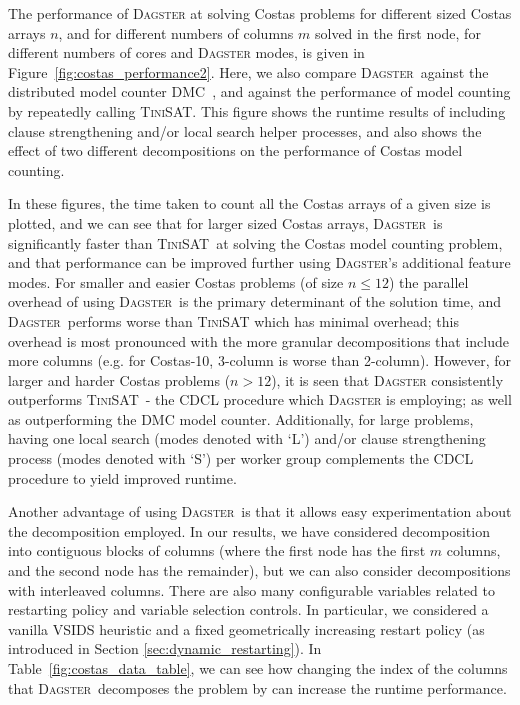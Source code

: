 \documentclass[10pt,a4paper,oneside,headinclude,footinclude,BCOR5mm]{scrartcl}
\newcommand{\dagster}{\textsc{Dagster}\xspace}
\newcommand{\tinisat}{\textsc{TiniSAT}\xspace}
\begin{document}
The performance of \dagster at solving Costas problems for different sized Costas arrays $n$, and for different numbers of columns $m$ solved in the first node, for different numbers of cores and \dagster modes, is given in Figure~\ref{fig:costas_performance2}.
Here, we also compare \dagster\ against the distributed model counter \textsc{DMC}~\cite{lagniez:etal:2018}, and against the performance of model counting by repeatedly calling \tinisat. 
This figure shows the runtime results of including clause strengthening and/or local search helper processes, and also shows the effect of two different decompositions on the performance of Costas model counting.


%



In these figures, the time taken to count all the Costas arrays of a given size is plotted, and we can see that for larger sized Costas arrays, \dagster\ is significantly faster than \tinisat\ at solving the Costas model counting problem, and that performance can be improved further using \dagster's additional feature modes.
For smaller and easier Costas problems (of size $n\le 12$) the parallel overhead of using \dagster\ is the primary determinant of the solution time, and \dagster\ performs worse than \tinisat which has minimal overhead; this overhead is most pronounced with the more granular decompositions that include more columns (e.g. for Costas-10, 3-column is worse than 2-column).
However, for larger and harder Costas problems ($n>12$), it is seen that \dagster consistently outperforms \tinisat\ - the CDCL procedure which \dagster is employing; as well as outperforming the \textsc{DMC} model counter.
Additionally, for large problems, having one local search (modes denoted with `L') and/or clause strengthening process (modes denoted with `S') per worker group complements the CDCL procedure to yield improved runtime.%

Another advantage of using \dagster\ is that it allows easy experimentation about the decomposition employed. In our results, we have considered decomposition into contiguous blocks of columns (where the first node has the first $m$ columns, and the second node has the remainder), but we can also consider decompositions with interleaved columns.
There are also many configurable variables related to restarting policy and variable selection controls.
In particular, we considered a vanilla VSIDS heuristic \cite{DBLP:conf/dac/MoskewiczMZZM01} and a fixed geometrically increasing restart policy (as introduced in Section \ref{sec:dynamic_restarting}).
In Table~\ref{fig:costas_data_table}, we can see how changing the index of the columns that \dagster\ decomposes the problem by can increase the runtime performance.
\end{document}
